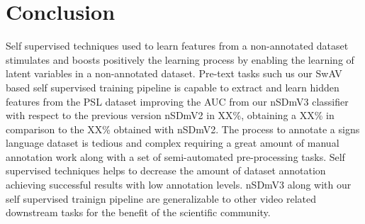 \documentclass[twocolumn,conference]{article}
\begin{document}
\section{Conclusion}\label{conclusion}
Self supervised techniques used to learn features from a non-annotated dataset stimulates and boosts positively the learning process by enabling the learning of latent variables in a non-annotated dataset. Pre-text tasks such us our SwAV based self supervised training pipeline is capable to extract and learn hidden features from the PSL dataset improving the AUC from our nSDmV3 classifier with respect to the previous version nSDmV2 in XX\%, obtaining a XX\% in comparison to the XX\% obtained with nSDmV2. The process to annotate a signs language dataset is tedious and complex requiring a great amount of manual annotation work along with a set of semi-automated pre-processing tasks. Self supervised techniques helps to decrease the amount of dataset annotation achieving successful results with low annotation levels. nSDmV3 along with our self supervised trainign pipeline are generalizable to other video related downstream tasks for the benefit of the scientific community.



\end{document}
